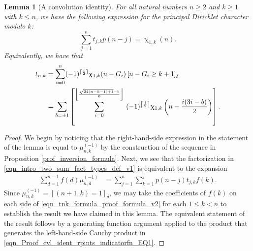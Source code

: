 \documentclass[12pt,reqno,a4letter]{article}
\numberwithin{figure}{section}
\numberwithin{table}{section}
\numberwithin{equation}{section}
\newcommand{\Iverson}[1]{\ensuremath{\left[#1\right]_{\delta}}}
\newcommand{\floor}[1]{\left\lfloor #1 \right\rfloor}
\newcommand{\ceiling}[1]{\left\lceil #1 \right\rceil}
\renewcommand{\chi}{\upchi}
\theoremstyle{plain}
\newtheorem{lemma}[theorem]{Lemma}
\numberwithin{theorem}{section}
\theoremstyle{definition}
\begin{document}
\begin{lemma}[A convolution identity] 
\label{lemma_cvl_ident_rpints_indicatorfn} 
For all natural numbers $n \geq 2$ and $k \geq 1$ with $k \leq n$, we have the 
following expression for the principal Dirichlet character modulo $k$: 
\[ 
\sum_{j=1}^n t_{j,k} p(n-j) = \chi_{1,k}(n). 
\] 
Equivalently, we have that 
\begin{align} 
\label{eqn_Proof_cvl_ident_rpints_indicatorfn_EQ1}
t_{n,k} & = \sum_{i=0}^n (-1)^{\lceil \frac{i}{2} \rceil} \chi_{1,k}(n-G_i) \Iverson{n-G_i \geq k+1} \\ 
\notag
     & = 
     \sum_{b = \pm 1} \left[\sum_{i=0}^{\floor{\frac{\sqrt{24(n-k-1)+1}-b}{6}}} \
     (-1)^{\ceiling{\frac{i}{2}}} \chi_{1,k}\left(n - \frac{i(3i-b)}{2}\right)
     \right].  
\end{align} 
\end{lemma} 
\begin{proof} 
We begin by noticing that the right-hand-side expression in the statement of the lemma 
is equal to $\mu_{n,k}^{(-1)}$ by the construction of the sequence in 
Proposition \ref{prof_inversion_formula}. 
Next, we see that the factorization in 
\eqref{eqn_intro_two_sum_fact_types_def_v1} is equivalent to the 
expansion 
\begin{align}
\label{eqn_tnk_formula_proof_formula_v2}  
\sum_{d=1}^{n-1} f(d) \mu_{n,d}^{(-1)} & = 
     \sum_{j=1}^n \sum_{k=1}^{j} p(n-j) t_{j,k} f(k). 
\end{align} 
Since $\mu_{n,k}^{(-1)} = \Iverson{(n+1, k) = 1}$, we may take the coefficients of $f(k)$ on 
each side of \eqref{eqn_tnk_formula_proof_formula_v2} 
for each $1 \leq k < n$ to establish the result we have claimed in this lemma. 
The equivalent statement of the result follows by a generating function argument 
applied to the product that generates the left-hand-side Cauchy product in 
\eqref{eqn_Proof_cvl_ident_rpints_indicatorfn_EQ1}. 
\end{proof}
\end{document}
